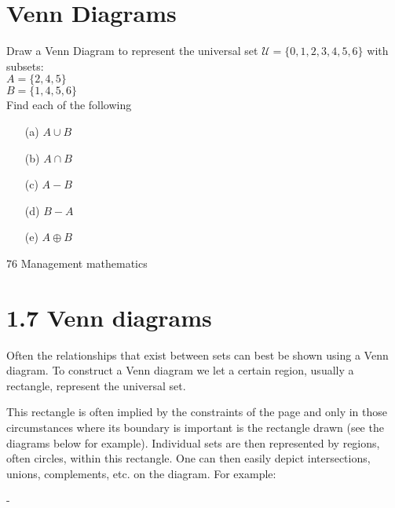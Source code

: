 \newpage

\section*{Venn Diagrams}

Draw a Venn Diagram to represent the universal set
$\mathcal{U} = \{0,1,2,3,4,5,6\}$ with subsets:\\
$A = \{2,4,5\}$\\
$B = \{1,4,5,6\}$\\

\noindent Find each of the following
\begin{itemize}
\item[(a)] $A \cup B $
\item[(b)] $A \cap B $
\item[(c)] $A-B$
\item[(d)] $B-A$
\item[(e)] $A \oplus B$
\end{itemize}
\newpage



76 Management mathematics

\section{1.7 Venn diagrams}
Often the relationships that exist between sets can best be shown using a
Venn diagram. To construct a Venn diagram we let a certain region, usually
a rectangle, represent the universal set. 

This rectangle is often implied
by the constraints of the page and only in those circumstances where its
boundary is important is the rectangle drawn (see the diagrams below for
example). Individual sets are then represented by regions, often circles,
within this rectangle. One can then easily depict intersections, unions,
complements, etc. on the diagram. For example:


 -%

